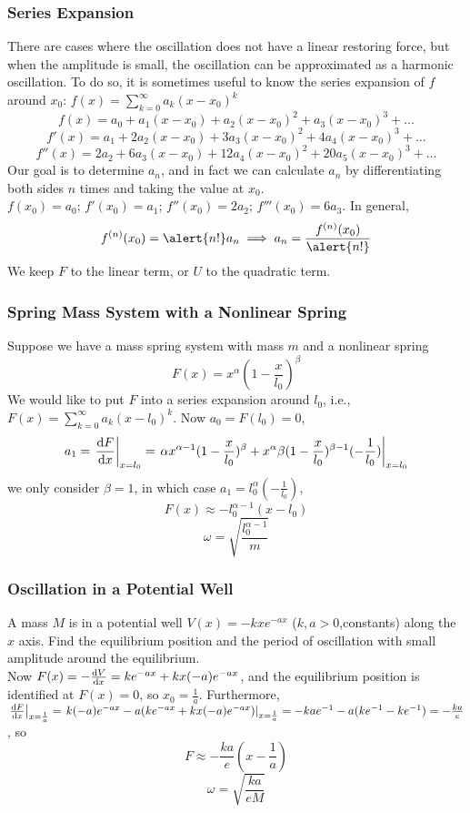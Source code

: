 \documentclass{beamer}
\begin{document}
\begin{frame}
\frametitle{Series Expansion}
There are cases where the oscillation does not have a linear restoring force, but when the amplitude is small, the oscillation can be \alert{approximated} as a harmonic oscillation. To do so, it is sometimes useful to know the series expansion of $f$ around $x_0$: $f(x)=\sum_{k=0}^{\infty}a_{k}(x-x_0)^k$
\[f(x)=a_0+a_1(x-x_0)+a_2(x-x_0)^2+a_3(x-x_0)^3+\dots\]
\[f'(x)=a_1+2a_2(x-x_0)+3a_3(x-x_0)^2+4a_4(x-x_0)^3+\dots\]
\[f''(x)=2a_2+6a_3(x-x_0)+12a_4(x-x_0)^2+20a_5(x-x_0)^3+\dots\]
Our goal is to determine $a_n$, and in fact we can calculate $a_n$ by \alert{differentiating} both sides $n$ times and \alert{taking the value} at $x_0$.\\
$f(x_0)=a_0$; $f'(x_0)=a_1$; $f''(x_0)=2a_2$; $f'''(x_0)=6a_3$. In general, \[f^{(n)}(x_0)=\alert{n!}a_n\implies a_n=\frac{f^{(n)}(x_0)}{\alert{n!}}\]
We keep $F$ to the \alert{linear} term, or $U$ to the \alert{quadratic} term.
\end{frame}
\begin{frame}
\frametitle{Spring Mass System with a Nonlinear Spring}
Suppose we have a mass spring system with mass $m$ and a nonlinear spring \[F(x)=x^{\alpha}(1-\frac{x}{l_0})^{\beta}\]We would like to put $F$ into a series expansion around $l_0$, i.e., $F(x)=\sum_{k=0}^{\infty}a_k(x-l_0)^k$. Now $a_0=F(l_0)=0$, \[a_1=\left.\frac{\mathrm{d} F}{\mathrm{d} x}\right|_{x=l_0}=\left.\alpha x^{\alpha-1}(1-\frac{x}{l_0})^\beta+x^\alpha\beta(1-\frac{x}{l_0})^{\beta-1}(-\frac{1}{l_0})\right|_{x=l_0}\]
we only consider $\beta=1$, in which case $a_1=l_0^\alpha(-\frac{1}{l_0})$, \[F(x)\approx - l_0^{\alpha-1}(x-l_0)\]\[\omega=\sqrt{\frac{l_0^{\alpha-1}}{m}}\]
\end{frame}
\begin{frame}
\frametitle{Oscillation in a Potential Well}
A mass $M$ is in a potential \alert{well} $V(x)=-kxe^{-ax}$ ($k,a>0$,constants) along the $x$ axis. Find the equilibrium position and the period of oscillation with small amplitude around the equilibrium.\\
Now $F(x)=-\frac{\mathrm{d} V}{\mathrm{d} x}=ke^{-ax}+kx(-a)e^{-ax}$, and the equilibrium position is identified at $F(x)=0$, so $x_0=\frac{1}{a}$. Furthermore, $\left.\frac{\mathrm{d} F}{\mathrm{d} x}\right|_{x=\frac{1}{a}}=\left.k(-a)e^{-ax}-a(ke^{-ax}+kx(-a)e^{-ax})\right|_{x=\frac{1}{a}}=-kae^{-1}-a(ke^{-1}-ke^{-1})=-\frac{ka}{e}$, so
\[F\approx-\frac{ka}{e}(x-\frac{1}{a})\]
\[\omega=\sqrt{\frac{ka}{eM}}\]
\end{frame}
\end{document}
